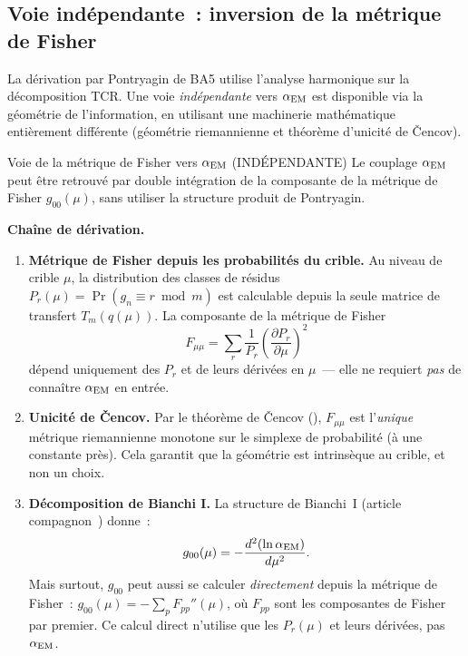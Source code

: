 \documentclass[12pt,a4paper]{article}
\begin{document}
\subsection{Voie indépendante~: inversion de la métrique de Fisher}
\label{sec:ch9_fisher_route}

La dérivation par Pontryagin de BA5 utilise l'analyse harmonique
sur la décomposition TCR. Une voie \emph{indépendante} vers
$\alpha_{\mathrm{EM}}$ est disponible via la géométrie de l'information, en
utilisant une machinerie mathématique entièrement différente
(géométrie riemannienne et théorème d'unicité de \v{C}encov).

\begin{derbox}{Voie de la métrique de Fisher vers $\alpha_{\mathrm{EM}}$ (INDÉPENDANTE)}
\label{der:fisher_route}
Le couplage $\alpha_{\mathrm{EM}}$ peut être retrouvé par double intégration
de la composante de la métrique de Fisher $g_{00}(\mu)$, sans
utiliser la structure produit de Pontryagin.

\medskip\noindent\textbf{Chaîne de dérivation.}

\begin{enumerate}[leftmargin=*, label=\textbf{(\roman*)}]
\item \textbf{Métrique de Fisher depuis les probabilités du crible.}
  Au niveau de crible $\mu$, la distribution des classes de résidus
  $P_r(\mu) = \Pr(g_n \equiv r \bmod m)$ est calculable depuis la
  seule matrice de transfert $T_m(q(\mu))$. La composante de la
  métrique de Fisher
  \begin{equation}
    F_{\mu\mu} = \sum_r \frac{1}{P_r}\left(\frac{\partial P_r}{\partial\mu}\right)^2
    \label{eq:fisher_component}
  \end{equation}
  dépend uniquement des $P_r$ et de leurs dérivées en $\mu$~--- elle
  ne requiert \emph{pas} de connaître $\alpha_{\mathrm{EM}}$ en entrée.

\item \textbf{Unicité de \v{C}encov.}
  Par le théorème de \v{C}encov (\cite{companion_M2}), $F_{\mu\mu}$
  est l'\emph{unique} métrique riemannienne monotone sur le
  simplexe de probabilité (à une constante près). Cela garantit
  que la géométrie est intrinsèque au crible, et non un choix.

\item \textbf{Décomposition de Bianchi I.}
  La structure de Bianchi~I (article
  compagnon~\cite{companion_physics}) donne~:
  \begin{equation}
    g_{00}(\mu) = -\frac{d^2(\ln\alpha_{\mathrm{EM}})}{d\mu^2}.
    \label{eq:g00_def}
  \end{equation}
  Mais surtout, $g_{00}$ peut aussi se calculer \emph{directement}
  depuis la métrique de Fisher~:
  $g_{00}(\mu) = -\sum_p F_{pp}''(\mu)$, où $F_{pp}$ sont les
  composantes de Fisher par premier. Ce calcul direct n'utilise
  que les $P_r(\mu)$ et leurs dérivées, pas $\alpha_{\mathrm{EM}}$.


\end{enumerate}
\end{derbox}
\end{document}
